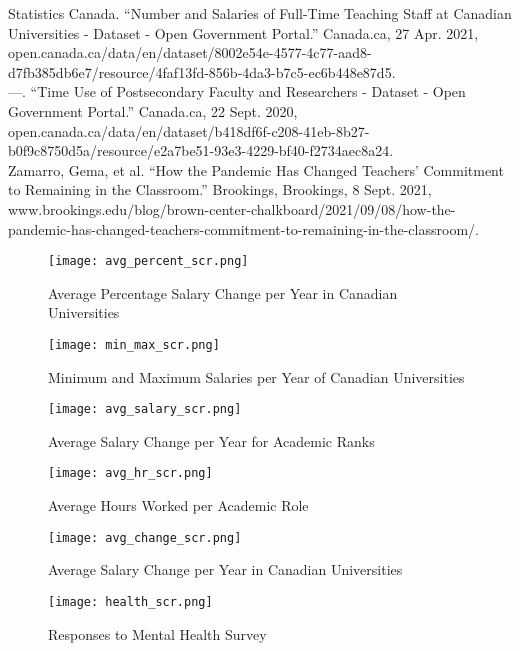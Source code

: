 \documentclass{article}
\begin{document}
\begin{hangparas}{.25in}{1}
Statistics Canada. “Number and Salaries of Full-Time Teaching Staff at Canadian Universities - Dataset - Open Government Portal.” Canada.ca, 27 Apr. 2021, open.canada.ca/data/en/dataset/8002e54e-4577-4c77-aad8-d7fb385db6e7/resource/4faf13fd-856b-4da3-b7c5-ec6b448e87d5.\\

---. “Time Use of Postsecondary Faculty and Researchers - Dataset - Open Government Portal.” Canada.ca, 22 Sept. 2020, open.canada.ca/data/en/dataset/b418df6f-c208-41eb-8b27-b0f9c8750d5a/resource/e2a7be51-93e3-4229-bf40-f2734aec8a24.\\

Zamarro, Gema, et al. “How the Pandemic Has Changed Teachers’ Commitment to Remaining in the Classroom.” Brookings, Brookings, 8 Sept. 2021, www.brookings.edu/blog/brown-center-chalkboard/2021/09/08/how-the-pandemic-has-changed-teachers-commitment-to-remaining-in-the-classroom/.
\end{hangparas}

\newpage
\begin{figure}
    \texttt{[image: avg\_percent\_scr.png]}
    \caption{Average Percentage Salary Change per Year in Canadian Universities}
    \texttt{[image: min\_max\_scr.png]}
    \caption{Minimum and Maximum Salaries per Year of Canadian Universities}
    \texttt{[image: avg\_salary\_scr.png]}
    \caption{Average Salary Change per Year for Academic Ranks}
\end{figure}
\begin{figure}
    \texttt{[image: avg\_hr\_scr.png]}
    \caption{Average Hours Worked per Academic Role}
    \texttt{[image: avg\_change\_scr.png]}
    \caption{Average Salary Change per Year in Canadian Universities}
    \texttt{[image: health\_scr.png]}
    \caption{Responses to Mental Health Survey}
\end{figure}
\end{document}
